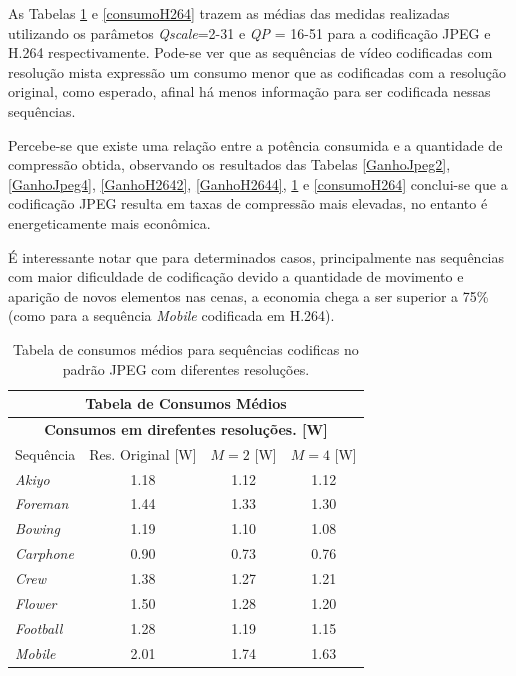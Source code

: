 As Tabelas \ref{comsumoJpeg} e \ref{consumoH264} trazem as médias das medidas realizadas utilizando os parâmetos \textit{Qscale}={2-31} e \textit{QP} = {16-51} para a codificação JPEG e H.264 respectivamente. Pode-se ver que as sequências de vídeo codificadas com resolução mista expressão um consumo menor que as codificadas com a resolução original, como esperado, afinal há menos informação para ser codificada nessas sequências.

Percebe-se que existe uma relação entre a potência consumida e a quantidade de compressão obtida, observando os resultados das Tabelas \ref{GanhoJpeg2}, \ref{GanhoJpeg4}, \ref{GanhoH2642}, \ref{GanhoH2644}, \ref{comsumoJpeg} e \ref{consumoH264} conclui-se que a codificação JPEG resulta em taxas de compressão mais elevadas, no entanto é energeticamente mais econômica. 

É interessante notar que para determinados casos, principalmente nas sequências com maior dificuldade de codificação devido a quantidade de movimento e aparição de novos elementos nas cenas, a economia chega a ser superior a 75\% (como para a sequência \textit{Mobile} codificada em H.264).

\begin{table}[hbt]
\centering
\caption{Tabela de consumos médios para sequências codificas no padrão JPEG com diferentes resoluções.}	
\label{comsumoJpeg}
\begin{tabular}{|l|c|c|c|}
\hline
\multicolumn{4}{|c|}{\textbf{Tabela  de Consumos Médios}}\\
\hline
\hline
\multicolumn{4}{|c|}{\textbf{Consumos em direfentes resoluções. [W]}}\\
\hline
\hline			
Sequência  & Res. Original [W]& $M = 2$ [W]&$M = 4$ [W] \\
\hline
\hline
\textit{Akiyo}		&1.18  &1.12   &1.12\\
\hline
\textit{Foreman}		&1.44 &1.33   &1.30\\
\hline
\textit{Bowing}		&1.19 &1.10   &1.08\\
\hline
\textit{Carphone}	& 0.90 &0.73   &0.76\\
\hline
\textit{Crew}		& 1.38 &1.27   &1.21\\
\hline
\textit{Flower}		&1.50 &1.28   &1.20\\
\hline
\textit{Football}	&1.28 &1.19   &1.15\\
\hline
\textit{Mobile}	&2.01 &1.74   &1.63\\
\hline
\end{tabular}
\end{table}


